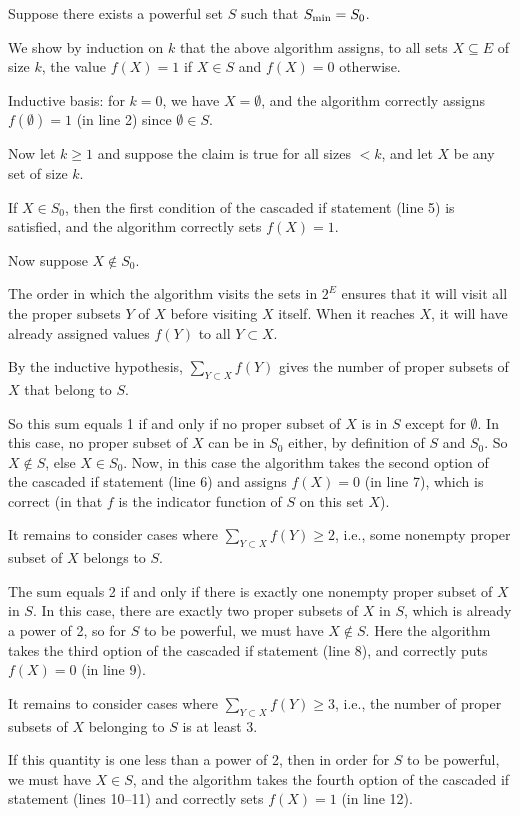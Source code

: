 \documentclass[12pt]{article}
\begin{document}
Suppose there exists a powerful set $S$ such that $S_{\scriptsize\hbox{min}}=S_0$.

We show by induction on $k$ that the above algorithm assigns, to all sets $X\subseteq E$
of size $k$, the value $f(X)=1$ if $X\in S$ and $f(X)=0$ otherwise.

Inductive basis:  for $k=0$, we have $X=\emptyset$, and the algorithm correctly assigns
$f(\emptyset)=1$ (in line 2) since $\emptyset\in S$.

Now let $k\ge1$ and
suppose the claim is true for all sizes $<k$, and let $X$ be any set of size $k$.

If $X\in S_0$, then the first condition of the cascaded if statement (line 5) is satisfied,
and the algorithm correctly sets $f(X)=1$.

Now suppose $X\not\in S_0$.

The order in which the algorithm visits the sets in $2^E$ ensures that it will visit all the proper
subsets $Y$ of $X$ before visiting $X$ itself.  When it reaches $X$,
it will have already assigned values $f(Y)$ to all $Y\subset X$.

By the inductive hypothesis, $\sum_{Y\subset X} f(Y)$ gives the number of proper subsets
of $X$ that belong to $S$.

So this sum equals 1 if and only if
no proper subset of $X$ is in $S$ except for $\emptyset$.
In this case, no proper subset of $X$
can be in $S_0$ either, by definition of $S$ and $S_0$.  So $X\not\in S$, else $X\in S_0$.
Now, in this case the algorithm takes the second option of the cascaded if statement (line 6)
and assigns $f(X)=0$ (in line 7), which is correct (in that $f$ is the indicator function of $S$ on this set
$X$).

It remains to consider cases where $\sum_{Y\subset X} f(Y)\ge2$, i.e.,
some nonempty proper subset of $X$ belongs to $S$.

The sum equals 2 if and only if there is exactly one nonempty proper subset of $X$ in $S$.
In this case, there are exactly two proper subsets of $X$ in $S$, which is already a power of 2,
so for $S$ to be powerful, we must have $X\not\in S$.
Here the algorithm takes the third option of the cascaded if statement (line 8), and correctly puts $f(X)=0$ (in line 9).

It remains to consider cases where $\sum_{Y\subset X} f(Y)\ge3$, i.e.,
the number of proper subsets of $X$ belonging to $S$ is at least 3.

If this quantity is one less than a power of 2, then in order for $S$ to be powerful, we must
have $X\in S$, and the algorithm takes the fourth option of the cascaded if statement
(lines 10--11) and correctly sets $f(X)=1$ (in line 12).
\end{document}
